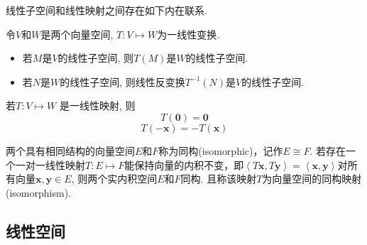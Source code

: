 \documentclass[lang=cn,10pt]{gorgeousnbook}
\numberwithin{equation}{section}%
\numberwithin{figure}{section}%
\begin{document}
线性子空间和线性映射之间存在如下内在联系.
\begin{theorem}
令$V$和$W$是两个向量空间, $T:V\mapsto W$为一线性变换. 
\begin{itemize}
\item 若$M$是$V$的线性子空间, 则$T\left( M\right) $是$W$的线性子空间.
\item 若$N$是$W$的线性子空间, 则线性反变换$T^{-1}\left( N\right)$是$V$的线性子空间. 
\end{itemize}
若$T: V\mapsto W$ 是一线性映射, 则
\begin{equation}
T\left( \mathbf{0}\right) = \mathbf{0}
\end{equation}
\begin{equation}
T\left( -\boldsymbol{x}\right) = -T\left( \boldsymbol{x}\right) 
\end{equation}
\end{theorem}
两个具有相同结构的向量空间$E$和$F$称为同构(isomorphic)，记作$E\cong F$. 若存在一个一对一线性映射$T:E\mapsto F$能保持向量的内积不变，即$\left< T\boldsymbol{x},T\boldsymbol{y} \right> =\left< \boldsymbol{x},\boldsymbol{y} \right> $对所有向量$\boldsymbol{x},\boldsymbol{y}\in E$, 则两个实内积空间$E$和$F$同构. 且称该映射$T$为向量空间的同构映射(isomorphism). 
\subsection{线性空间}
\end{document}
